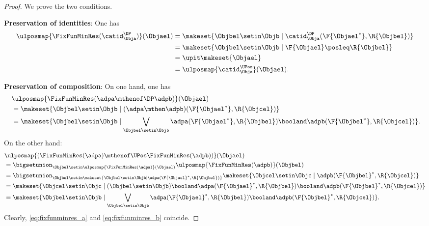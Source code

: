 \begin{proof}
    We prove the two conditions.

    \textbf{Preservation of identities}:
    One has
    \begin{equation}
        \begin{aligned}
            \ulposmap{\FixFunMinRes(\catid_{\Obja}^{\DP})}(\Objael) & =\makeset{ \Objbel\setin \Objb\mid \catid_{\Obja}^{\DP}(\F{\Objael^*},\R{\Objbel})} \\
                                                                    & =\makeset{ \Objbel \setin \Objb\mid \F{\Objael}\posleq\R{\Objbel}} \\
                                                                    & =\upit \makeset{ \Objael} \\
                                                                    & =\ulposmap{\catid_{\Obja}^{\UPos}}(\Objael).
        \end{aligned}
    \end{equation}

    \textbf{Preservation of composition}:
    On one hand, one has
    \begin{equation}
        \label{eq:fixfunminres_a}
        \begin{aligned}
            ~ & \ulposmap{\FixFunMinRes(\adpa\mthenof\DP \adpb)}(\Objael) \\
              & =\makeset{ \Objbel\setin \Objb\mid (\adpa\mthen \adpb)(\F{\Objael^*},\R{\Objcel})} \\
              & =\makeset{ \Objbel\setin \Objb\mid \bigvee_{\Objbel \setin \Objb}\adpa(\F{\Objael^*},\R{\Objbel})\booland \adpb(\F{\Objbel^*},\R{\Objcel})}.
        \end{aligned}
    \end{equation}
    On the other hand:
    \begin{equation}
        \label{eq:fixfunminres_b}
        \begin{aligned}
             & \ulposmap{(\FixFunMinRes(\adpa)\mthenof\UPos \FixFunMinRes(\adpb))}(\Objael) \\
             & =\bigsetunion_{\Objbel \setin \ulposmap{\FixFunMinRes(\adpa)}(\Objael)}\ulposmap{\FixFunMinRes(\adpb)}(\Objbel) \\
             & =\bigsetunion_{\Objbel \setin \makeset{ \Objbel \setin \Objb \mid \adpa(\F{\Objael}^*,\R{\Objbel})}} \makeset{\Objcel \setin \Objc \mid \adpb(\F{\Objbel}^*,\R{\Objcel})} \\
             & =\makeset{\Objcel\setin \Objc \mid (\Objbel \setin \Objb)\booland \adpa(\F{\Objael}^*,\R{\Objbel})\booland \adpb(\F{\Objbel}^*,\R{\Objcel})} \\
             & =\makeset{ \Objbel\setin \Objb\mid \bigvee_{\Objbel \setin \Objb}\adpa(\F{\Objael}^*,\R{\Objbel})\booland \adpb(\F{\Objbel}^*,\R{\Objcel})}.
        \end{aligned}
    \end{equation}
    Clearly, \cref{eq:fixfunminres_a} and \cref{eq:fixfunminres_b} coincide.
\end{proof}

